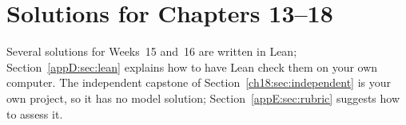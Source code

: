 \chapter{Solutions for Chapters 13--18}\label{app:solc}
Several solutions for Weeks~15 and~16 are written in Lean; Section~\ref{appD:sec:lean} explains how to have Lean check them on your own computer. The independent capstone of Section~\ref{ch18:sec:independent} is your own project, so it has no model solution; Section~\ref{appE:sec:rubric} suggests how to assess it.








